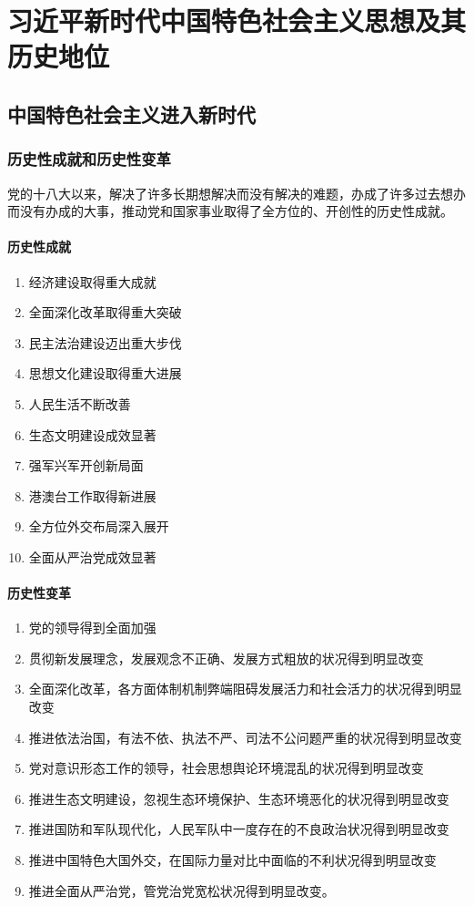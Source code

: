 \chapter{习近平新时代中国特色社会主义思想及其历史地位}


\section{中国特色社会主义进入新时代}
    \subsection{历史性成就和历史性变革}
        党的十八大以来，解决了许多长期想解决而没有解决的难题，办成了许多过去想办而没有办成的大事，推动党和国家事业取得了全方位的、开创性的历史性成就。
        \subsubsection{历史性成就}
        \begin{enumerate}
            \item 经济建设取得重大成就
            \item 全面深化改革取得重大突破
            \item 民主法治建设迈出重大步伐
            \item 思想文化建设取得重大进展
            \item 人民生活不断改善
            \item 生态文明建设成效显著
            \item 强军兴军开创新局面
            \item 港澳台工作取得新进展
            \item 全方位外交布局深入展开
            \item 全面从严治党成效显著
        \end{enumerate}

        \subsubsection{历史性变革}
        \begin{enumerate}
            \item 党的领导得到全面加强
            \item 贯彻新发展理念，发展观念不正确、发展方式粗放的状况得到明显改变
            \item 全面深化改革，各方面体制机制弊端阻碍发展活力和社会活力的状况得到明显改变
            \item 推进依法治国，有法不依、执法不严、司法不公问题严重的状况得到明显改变
            \item 党对意识形态工作的领导，社会思想舆论环境混乱的状况得到明显改变
            \item 推进生态文明建设，忽视生态环境保护、生态环境恶化的状况得到明显改变
            \item 推进国防和军队现代化，人民军队中一度存在的不良政治状况得到明显改变
            \item 推进中国特色大国外交，在国际力量对比中面临的不利状况得到明显改变
            \item 推进全面从严治党，管党治党宽松状况得到明显改变。
        \end{enumerate}

